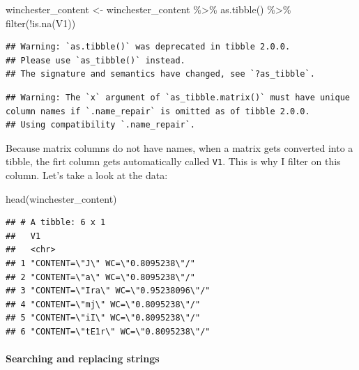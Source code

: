 \documentclass[
]{article}
\newenvironment{Shaded}{\begin{snugshade}}{\end{snugshade}}
\newcommand{\FunctionTok}[1]{\textcolor[rgb]{0.00,0.00,0.00}{#1}}
\newcommand{\NormalTok}[1]{#1}
\newcommand{\OtherTok}[1]{\textcolor[rgb]{0.56,0.35,0.01}{#1}}
\newcommand{\SpecialCharTok}[1]{\textcolor[rgb]{0.00,0.00,0.00}{#1}}
\begin{document}
\begin{Shaded}
\begin{Highlighting}[]
\NormalTok{winchester\_content }\OtherTok{\textless{}{-}}\NormalTok{ winchester\_content }\SpecialCharTok{\%\textgreater{}\%}
  \FunctionTok{as.tibble}\NormalTok{() }\SpecialCharTok{\%\textgreater{}\%}
  \FunctionTok{filter}\NormalTok{(}\SpecialCharTok{!}\FunctionTok{is.na}\NormalTok{(V1))}
\end{Highlighting}
\end{Shaded}

\begin{verbatim}
## Warning: `as.tibble()` was deprecated in tibble 2.0.0.
## Please use `as_tibble()` instead.
## The signature and semantics have changed, see `?as_tibble`.
\end{verbatim}

\begin{verbatim}
## Warning: The `x` argument of `as_tibble.matrix()` must have unique column names if `.name_repair` is omitted as of tibble 2.0.0.
## Using compatibility `.name_repair`.
\end{verbatim}

Because matrix columns do not have names, when a matrix gets converted into a tibble, the firt column
gets automatically called \texttt{V1}. This is why I filter on this column. Let's take a look at the data:

\begin{Shaded}
\begin{Highlighting}[]
\FunctionTok{head}\NormalTok{(winchester\_content)}
\end{Highlighting}
\end{Shaded}

\begin{verbatim}
## # A tibble: 6 x 1
##   V1                                  
##   <chr>                               
## 1 "CONTENT=\"J\" WC=\"0.8095238\"/"   
## 2 "CONTENT=\"a\" WC=\"0.8095238\"/"   
## 3 "CONTENT=\"Ira\" WC=\"0.95238096\"/"
## 4 "CONTENT=\"mj\" WC=\"0.8095238\"/"  
## 5 "CONTENT=\"iI\" WC=\"0.8095238\"/"  
## 6 "CONTENT=\"tE1r\" WC=\"0.8095238\"/"
\end{verbatim}

\hypertarget{searching-and-replacing-strings}{%
\paragraph{Searching and replacing strings}\label{searching-and-replacing-strings}}
\end{document}
